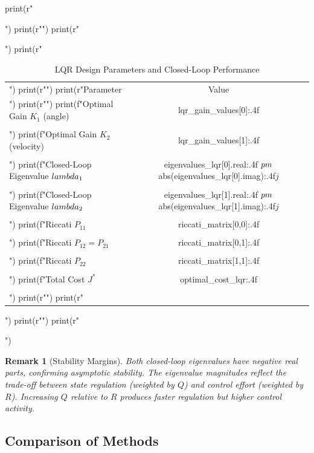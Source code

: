 \documentclass[a4paper, 11pt]{article}
\newtheorem{remark}{Remark}[section]
\begin{document}
\begin{pycode}
print(r"\begin{table}[htbp]")
print(r"\centering")
print(r"\caption{LQR Design Parameters and Closed-Loop Performance}")
print(r"\begin{tabular}{lc}")
print(r"\toprule")
print(r"Parameter & Value \\")
print(r"\midrule")
print(f"Optimal Gain $K_1$ (angle) & {lqr_gain_values[0]:.4f} \\\\")
print(f"Optimal Gain $K_2$ (velocity) & {lqr_gain_values[1]:.4f} \\\\")
print(f"Closed-Loop Eigenvalue $\\lambda_1$ & {eigenvalues_lqr[0].real:.4f} $\\pm$ {abs(eigenvalues_lqr[0].imag):.4f}$j$ \\\\")
print(f"Closed-Loop Eigenvalue $\\lambda_2$ & {eigenvalues_lqr[1].real:.4f} $\\pm$ {abs(eigenvalues_lqr[1].imag):.4f}$j$ \\\\")
print(f"Riccati $P_{{11}}$ & {riccati_matrix[0,0]:.4f} \\\\")
print(f"Riccati $P_{{12}} = P_{{21}}$ & {riccati_matrix[0,1]:.4f} \\\\")
print(f"Riccati $P_{{22}}$ & {riccati_matrix[1,1]:.4f} \\\\")
print(f"Total Cost $J^*$ & {optimal_cost_lqr:.4f} \\\\")
print(r"\bottomrule")
print(r"\end{tabular}")
print(r"\label{tab:lqr}")
print(r"\end{table}")
\end{pycode}

\begin{remark}[Stability Margins]
Both closed-loop eigenvalues have negative real parts, confirming asymptotic stability.
The eigenvalue magnitudes reflect the trade-off between state regulation (weighted by $Q$)
and control effort (weighted by $R$). Increasing $Q$ relative to $R$ produces faster
regulation but higher control activity.
\end{remark}

\subsection{Comparison of Methods}
\end{document}
